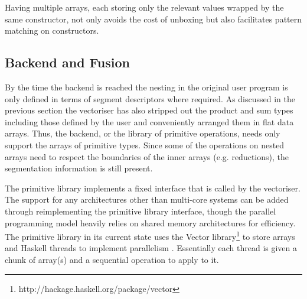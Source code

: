 \documentclass[preamble.tex]{subfiles}
\begin{document}
Having multiple arrays, each storing only the relevant values wrapped by the same constructor, not only avoids the cost of unboxing but also facilitates pattern matching on constructors.


\subsection{Backend and Fusion}

By the time the backend is reached the nesting in the original user program is only defined in terms of segment descriptors where required. As discussed in the previous section the vectoriser has also stripped out the product and sum types including those defined by the user and conveniently arranged them in flat data arrays. Thus, the backend, or the library of primitive operations, needs only support the arrays of primitive types. Since some of the operations on nested arrays need to respect the boundaries of the inner arrays (e.g. reductions), the segmentation information is still present.

The primitive library implements a fixed interface that is called by the vectoriser. The support for any architectures other than multi-core systems can be added through reimplementing the primitive library interface, though the parallel programming model heavily relies on shared memory architectures for efficiency. The primitive library in its current state uses the Vector library\footnote{http://hackage.haskell.org/package/vector } to store arrays and Haskell threads to implement parallelism \cite{Jones08atutorial}. Essentially each thread is given a chunk of array(s) and a sequential operation to apply to it.
\end{document}
